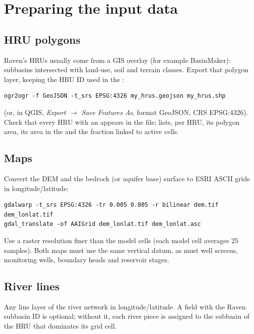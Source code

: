 \section{Preparing the input data}
\subsection{HRU polygons}
Raven's HRUs usually come from a GIS overlay (for example BasinMaker): subbasins intersected with land-use, soil and terrain
classes. Export that polygon layer, keeping the HRU ID used in the :
\par\noindent\begin{minipage}{\linewidth}
\begin{lstlisting}
ogr2ogr -f GeoJSON -t_srs EPSG:4326 my_hrus.geojson my_hrus.shp
\end{lstlisting}
\end{minipage}\par\smallskip
(or, in QGIS, \emph{Export $\rightarrow$ Save Features As}, format GeoJSON, CRS EPSG:4326). Check that every HRU with an
 appears in the file;  lists, per HRU, its polygon area, its area in the 
and the fraction linked to active cells.
\subsection{Maps}
Convert the DEM and the bedrock (or aquifer base) surface to ESRI ASCII grids in longitude/latitude:
\par\noindent\begin{minipage}{\linewidth}
\begin{lstlisting}
gdalwarp -t_srs EPSG:4326 -tr 0.005 0.005 -r bilinear dem.tif dem_lonlat.tif
gdal_translate -of AAIGrid dem_lonlat.tif dem_lonlat.asc
\end{lstlisting}
\end{minipage}\par\smallskip
Use a raster resolution finer than the model cells (each model cell averages 25 samples). Both maps must use the same
vertical datum, as must well screens, monitoring wells, boundary heads and reservoir stages.
\subsection{River lines}
Any line layer of the river network in longitude/latitude. A field with the Raven subbasin ID is optional; without it, each
river piece is assigned to the subbasin of the HRU that dominates its grid cell.
